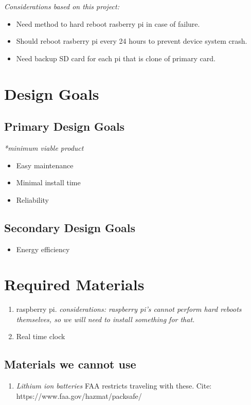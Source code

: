 \documentclass[12pt, letterpaper]{article}
\begin{document}
\textit{Considerations based on this project:}
%
\begin{itemize}
%
\item Need method to hard reboot rasberry pi in case of failure.
\item Should reboot rasberry pi every 24 hours to prevent device system crash.
\item Need backup SD card for each pi that is clone of primary card.
%
\end{itemize}


\section{Design Goals}
%
\subsection{Primary Design Goals}
%
\textit{*minimum viable product}
%
\begin{itemize}
%
\item Easy maintenance
%
\item Minimal install time
%
\item Reliability
%
\end{itemize}
%

\subsection{Secondary Design Goals}
%
\begin{itemize}
%
\item Energy efficiency
%
\end{itemize}


\section{Required Materials}
\begin{enumerate}
\item raspberry pi. \textit{considerations: raspberry pi's cannot perform hard reboots themselves,
so we will need to install something for that.}
\item Real time clock
\end{enumerate}

\subsection{Materials we cannot use}
\begin{enumerate}
\item \textit{Lithium ion batteries} FAA restricts traveling with these. Cite: https://www.faa.gov/hazmat/packsafe/
\end{enumerate}
\end{document}
